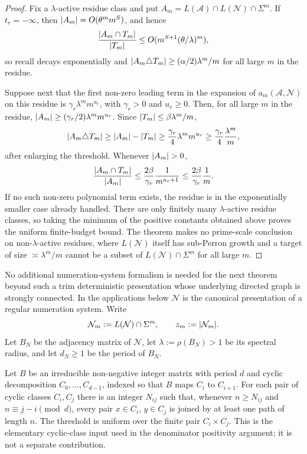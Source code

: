 \begin{proof}
  Fix a \(\lambda\)-active residue class and put
  \(A_m=L(\mathcal A)\cap L(\mathcal N)\cap\Sigma^m\). If
  \(t_r=-\infty\), then \(\lvert A_m \rvert=O(\theta^m m^S)\), and hence
  \[
    \frac{\lvert A_m\cap T_m \rvert}{\lvert T_m \rvert}
    \le
    O(m^{S+1}(\theta/\lambda)^m),
  \]
  so recall decays exponentially and
  \(\lvert A_m\triangle T_m \rvert\ge(\alpha/2)\lambda^m/m\) for all large
  \(m\) in the residue.

  Suppose next that the first non-zero leading term in the expansion of
  \(a_m(\mathcal A,\mathcal N)\) on this residue is
  \(\gamma_r\lambda^m m^{u_r}\), with \(\gamma_r>0\) and \(u_r\ge0\).
  Then, for all large \(m\) in the residue,
  \(\lvert A_m \rvert\ge(\gamma_r/2)\lambda^m m^{u_r}\). Since
  \(\lvert T_m \rvert\le\beta\lambda^m/m\),
  \[
    \lvert A_m\triangle T_m \rvert
    \ge \lvert A_m \rvert-\lvert T_m \rvert
    \ge \frac{\gamma_r}{4}\lambda^m m^{u_r}
    \ge \frac{\gamma_r}{4}\frac{\lambda^m}{m},
  \]
  after enlarging the threshold. Whenever \(\lvert A_m \rvert>0\),
  \[
    \frac{\lvert A_m\cap T_m \rvert}{\lvert A_m \rvert}
    \le
    \frac{2\beta}{\gamma_r}\frac{1}{m^{u_r+1}}
    \le
    \frac{2\beta}{\gamma_r}\frac1m .
  \]
  If no such non-zero polynomial term exists, the residue is in the
  exponentially smaller case already handled. There are only finitely
  many \(\lambda\)-active residue classes, so taking the minimum of the
  positive constants obtained above proves the uniform finite-budget
  bound. The theorem makes no prime-scale conclusion on
  non-\(\lambda\)-active residues, where \(L(\mathcal N)\) itself has
  sub-Perron growth and a target of size \(\asymp\lambda^m/m\) cannot
  be a subset of \(L(\mathcal N)\cap\Sigma^m\) for all large \(m\).
\end{proof}

No additional numeration-system formalism is needed for the next
theorem beyond such a trim deterministic presentation whose underlying
directed graph is strongly connected. In the applications below
\(\mathcal N\) is the canonical presentation of a regular numeration
system. Write
\[
  \mathcal N_m:=L(\mathcal N)\cap\Sigma^m,
  \qquad
  z_m:=\lvert \mathcal N_m \rvert.
\]
Let \(B_N\) be the adjacency matrix of \(\mathcal N\), let
\(\lambda:=\rho(B_N)>1\) be its spectral radius, and let \(d_N\ge 1\)
be the period of \(B_N\).

\begin{lemma}
  \label{lem:cyclic-class-path-threshold}
  Let \(B\) be an irreducible non-negative integer matrix with period
  \(d\) and cyclic decomposition \(C_0,\dots,C_{d-1}\), indexed so that
  \(B\) maps \(C_i\) to \(C_{i+1}\). For each pair of cyclic classes
  \(C_i,C_j\) there is an integer \(N_{ij}\) such that, whenever
  \(n\ge N_{ij}\) and \(n\equiv j-i\pmod d\), every pair
  \(x\in C_i\), \(y\in C_j\) is joined by at least one path of length
  \(n\). The threshold is uniform over the finite pair
  \(C_i\times C_j\).
  This is the elementary cyclic-class input used in the denominator
  positivity argument; it is not a separate contribution.
\end{lemma}

